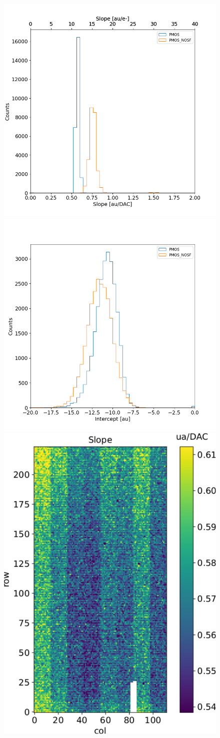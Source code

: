         \begin{figure}[h!]
            \centering
            \includegraphics[width=.49\linewidth]{figures/charaterization/slope_histogram.png}
            \includegraphics[width=.49\linewidth]{figures/charaterization/intercept_histogram.png}\\
            \includegraphics[width=.49\linewidth]{figures/charaterization/slope_map.pdf}

\end{figure}
